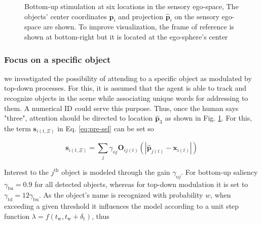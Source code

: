 \documentclass[letterpaper, 10 pt, conference]{ieeeconf}  %
\begin{document}
\begin{figure}[h!]
\begin{center}
			\caption{Bottom-up stimulation at six locations in the sensory ego-space, The objects' center coordinates $\mathbf{p}_i$ and projection $\mathbf{\hat{p}}_i$ on the sensory ego-space are shown. To improve visualization, the frame of reference is shown at bottom-right but it is located at the ego-sphere's center}
			\label{fig:sim_objs}
			\end{center}
		\end{figure}
				
	\subsubsection{Focus on a specific object}
	
	we investigated the possibility of attending to a specific object as modulated by top-down processes. For this, it is assumed that the agent is able to track and recognize objects in the scene while associating unique words for addressing to them. A numerical ID could serve this purpose. Thus, once the human says "three", attention should be directed to location $\mathbf{\hat{p}}_3$ as shown in Fig. \ref{fig:sim_objs}. For this, the term $\mathbf{s}_{i(t,\Xi)}$ in Eq. \eqref{eq:pre-sel} can be set so
	
	\begin{equation}
	\mathbf{s}_{i(t,\Xi)} = \sum_{j}^{} \gamma_{\mathrm{o}j}\mathbf{O}_{ij(t)}\left(|\mathbf{\hat{p}}_{j(t)} - \mathbf{x}_{i(t)}|\right)
	\label{eq:sim1}
	\end{equation}
	
	Interest to the $j^{\mathrm{th}}$ object is modeled through the gain $\gamma_{\mathrm{o}j}$. For bottom-up saliency  $\gamma_\mathrm{bu} = 0.9$ for all detected objects, whereas for top-down modulation it is set to $\gamma_\mathrm{td} = 12\gamma_\mathrm{bu}$. As the object's name is recognized with probability $w$, when exceeding a given threshold it influences the model according to a unit step function $\lambda = f(t_\mathrm{w}, t_\mathrm{w}+\delta_\mathrm{t})$, thus
	
\end{document}
